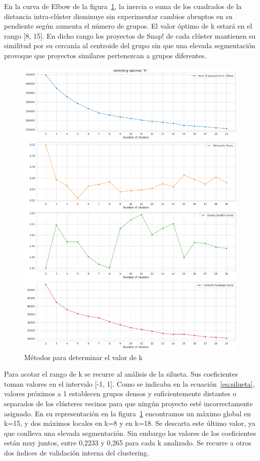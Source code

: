 \documentclass[a4paper, 12pt]{book}
\begin{document}
En la curva de Elbow de la figura~\ref{fig:determine_k}, la inercia o suma de los cuadrados de la distancia intra-clúster disminuye sin experimentar cambios abruptos en su pendiente según aumenta el número de grupos. El valor óptimo de k estará en el rango [8, 15]. En dicho rango los proyectos de Snap! de cada clúster mantienen su similitud por su cercanía al centroide del grupo sin que una elevada segmentación provoque que proyectos similares pertenezcan a grupos diferentes. 

\begin{figure}[H]
    \centering
    \includegraphics[height=.58\textheight]{img/select_k.png}
    \caption{Métodos para determinar el valor de k}\label{fig:determine_k}
\end{figure}

Para acotar el rango de k se recurre al análisis de la silueta. Sus coeficientes toman valores en el intervalo [-1, 1]. Como se indicaba en la ecuación~\eqref{eq:silueta}, valores próximos a 1 establecen grupos densos y suficientemente distantes o separados de los clústeres vecinos para que ningún proyecto esté incorrectamente asignado. En su representación en la figura~\ref{fig:determine_k} encontramos un máximo global en k=15, y dos máximos locales en k=8 y en k=18. Se descarta este último valor, ya que conlleva una elevada segmentación. Sin embargo los valores de los coeficientes están muy juntos, entre 0,2233 y 0,265 para cada k analizado. Se recurre a otros dos índices de validación interna del clustering. 
\end{document}
